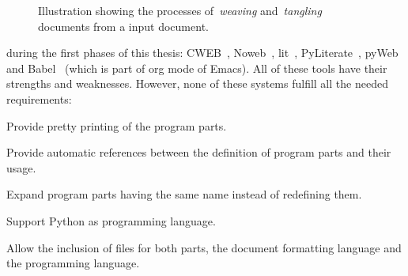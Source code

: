 \documentclass[%
    a4paper,    %
    justified,  %
    nobib,      %
    openany     %
]{tufte-book}
\begin{document}
\begin{figure}
  \label{fig:weave-and-tangle}
  \caption{Illustration showing the processes of~\emph{weaving}
    and~\emph{tangling} documents from a input document.~\cite{knuth-lp-1984}}
\end{figure}

 during the
first phases of this thesis:
CWEB~,
Noweb~,
lit~,
PyLiterate~,
pyWeb~ and
Babel~ (which is part
of org mode of Emacs). All of these tools have their strengths and weaknesses.
However, none of these systems fulfill all the needed requirements:
\begin{enumerate*}
  \item Provide pretty printing of the program parts.
  \item Provide automatic references between the definition of program parts and
    their usage.
  \item Expand program parts having the same name instead of redefining them.
  \item Support Python as programming language.
  \item Allow the inclusion of files for both parts, the document formatting
    language and the programming language.
\end{enumerate*}
\end{document}
